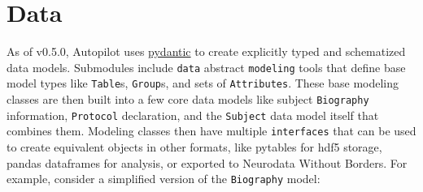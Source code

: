 \section{Data}
\label{sec:datamodel}

As of v0.5.0, Autopilot uses \href{https://pydantic-docs.helpmanual.io/}{pydantic} to create explicitly typed and schematized data models. Submodules include \texttt{data} abstract \texttt{modeling} tools that define base model types like \texttt{Table}s, \texttt{Group}s, and sets of \texttt{Attributes}. These base modeling classes are then built into a few core data models like subject \texttt{Biography} information, \texttt{Protocol} declaration, and the \texttt{Subject} data model itself that combines them. Modeling classes then have multiple \texttt{interfaces} that can be used to create equivalent objects in other formats, like pytables for hdf5 storage, pandas dataframes for analysis, or exported to Neurodata Without Borders.
\clearpage
For example, consider a simplified version of the \texttt{Biography} model:

